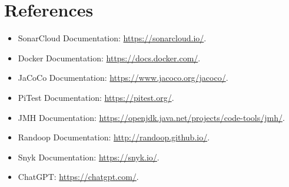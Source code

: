 \documentclass[a4paper,12pt]{report}
\begin{document}
\newpage

\chapter{References}
\begin{itemize}
    \item SonarCloud Documentation: \url{https://sonarcloud.io/}.
    \item Docker Documentation: \url{https://docs.docker.com/}.
    \item JaCoCo Documentation: \url{https://www.jacoco.org/jacoco/}.
    \item PiTest Documentation: \url{https://pitest.org/}.
    \item JMH Documentation: \url{https://openjdk.java.net/projects/code-tools/jmh/}.
    \item Randoop Documentation: \url{http://randoop.github.io/}.
    \item Snyk Documentation: \url{https://snyk.io/}.
    \item ChatGPT: \url{https://chatgpt.com/}.
\end{itemize}
\end{document}
